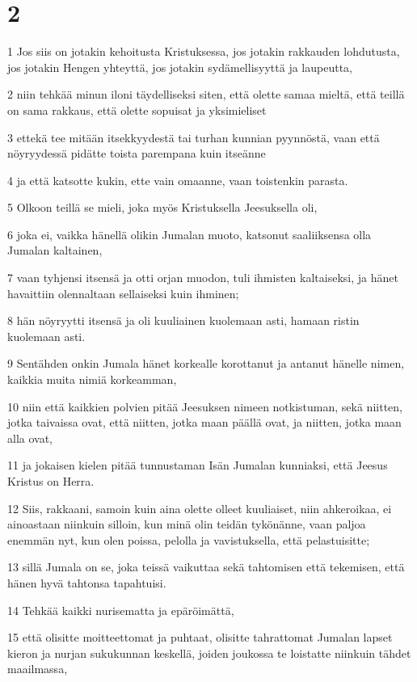 \chapter{2}

\par 1 Jos siis on jotakin kehoitusta Kristuksessa, jos jotakin rakkauden lohdutusta, jos jotakin Hengen yhteyttä, jos jotakin sydämellisyyttä ja laupeutta,
\par 2 niin tehkää minun iloni täydelliseksi siten, että olette samaa mieltä, että teillä on sama rakkaus, että olette sopuisat ja yksimieliset
\par 3 ettekä tee mitään itsekkyydestä tai turhan kunnian pyynnöstä, vaan että nöyryydessä pidätte toista parempana kuin itseänne
\par 4 ja että katsotte kukin, ette vain omaanne, vaan toistenkin parasta.
\par 5 Olkoon teillä se mieli, joka myös Kristuksella Jeesuksella oli,
\par 6 joka ei, vaikka hänellä olikin Jumalan muoto, katsonut saaliiksensa olla Jumalan kaltainen,
\par 7 vaan tyhjensi itsensä ja otti orjan muodon, tuli ihmisten kaltaiseksi, ja hänet havaittiin olennaltaan sellaiseksi kuin ihminen;
\par 8 hän nöyryytti itsensä ja oli kuuliainen kuolemaan asti, hamaan ristin kuolemaan asti.
\par 9 Sentähden onkin Jumala hänet korkealle korottanut ja antanut hänelle nimen, kaikkia muita nimiä korkeamman,
\par 10 niin että kaikkien polvien pitää Jeesuksen nimeen notkistuman, sekä niitten, jotka taivaissa ovat, että niitten, jotka maan päällä ovat, ja niitten, jotka maan alla ovat,
\par 11 ja jokaisen kielen pitää tunnustaman Isän Jumalan kunniaksi, että Jeesus Kristus on Herra.
\par 12 Siis, rakkaani, samoin kuin aina olette olleet kuuliaiset, niin ahkeroikaa, ei ainoastaan niinkuin silloin, kun minä olin teidän tykönänne, vaan paljoa enemmän nyt, kun olen poissa, pelolla ja vavistuksella, että pelastuisitte;
\par 13 sillä Jumala on se, joka teissä vaikuttaa sekä tahtomisen että tekemisen, että hänen hyvä tahtonsa tapahtuisi.
\par 14 Tehkää kaikki nurisematta ja epäröimättä,
\par 15 että olisitte moitteettomat ja puhtaat, olisitte tahrattomat Jumalan lapset kieron ja nurjan sukukunnan keskellä, joiden joukossa te loistatte niinkuin tähdet maailmassa,
